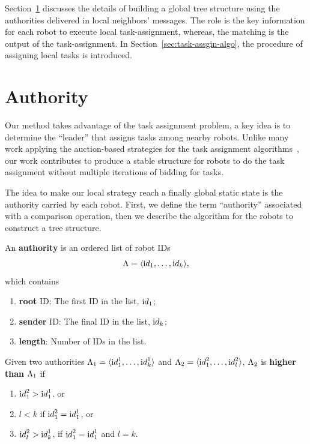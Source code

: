Section~\ref{sec:auth} discusses the details of building a global tree structure using the authorities delivered in local neighbors' messages.
% 
The role is the key information for each robot to execute local task-assignment,
%
whereas, the matching is the output of the task-assignment.
%
In Section~\ref{sec:task-assgin-algo}, the procedure of assigning local tasks is introduced.

\section{Authority}
\label{sec:auth}

Our method takes advantage of the task assignment problem, a key idea
is to determine the ``leader'' that assigns tasks among nearby robots. 
%
Unlike many work applying the auction-based strategies for the task assignment algorithms~\cite{Ber88, FarIocNarZip06, ZavSpePap08, MicZavKumPap08, ChoBruHow09, ChaHenIAS13, LiuShe13}, 
our work contributes to produce a stable structure for robots to do the 
task assignment without multiple iterations of bidding for tasks.


The idea to make our local strategy reach a finally global static state is the authority carried by each robot.  
%
First, we define the term ``authority'' associated with a comparison operation, then we describe the algorithm for the robots to construct a tree structure.

\begin{defn}
  An \textbf{authority} is an ordered list of robot IDs
    $$\Lambda = \langle {\textrm id}_1, \ldots, {\textrm id}_k \rangle,$$
   which contains
    \begin{enumerate}
    \item \textbf{root} ID: The first ID in the list, ${\textrm id}_1$;
    \item \textbf{sender} ID: The final ID in the list, ${\textrm id}_k$;
    \item \textbf{length}: Number of IDs in the list.
    \end{enumerate}
\end{defn}

\begin{defn}
  Given two authorities
    $\Lambda_1=\langle {\textrm id}_1^1, \ldots, {\textrm id}_k^1\rangle$
  and
    $\Lambda_2=\langle {\textrm id}_1^2, \ldots, {\textrm id}_l^2\rangle$,
  $\Lambda_2$ is \textbf{higher than} $\Lambda_1$ if 
  \begin{enumerate}
    \item ${\textrm id}_1^2 > {\textrm id}_1^1$, or
    \item $l < k$ if ${\textrm id}_1^2 = {\textrm id}_1^1$, or
    \item ${\textrm id}_l^2 > {\textrm id}_k^1$, if ${\textrm id}_1^2 = {\textrm id}_1^1$ and $l = k$.
  \end{enumerate}
\end{defn}


